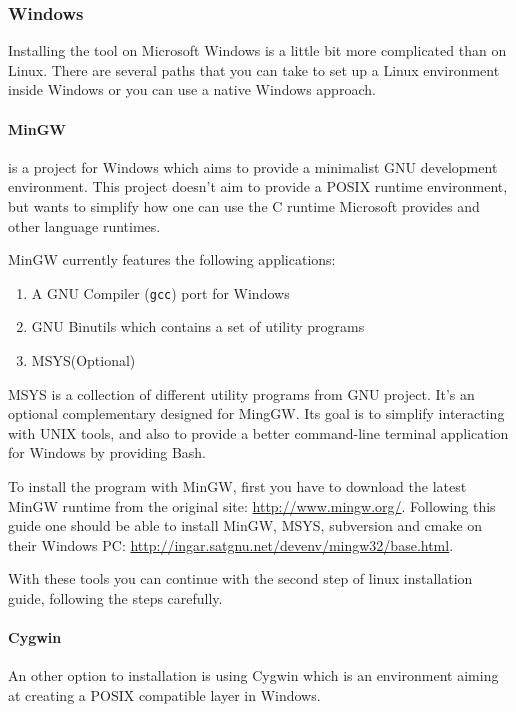 \subsubsection{Windows}
\par Installing the tool on Microsoft Windows is a little bit more complicated than on Linux. There are several paths that you can take to set up a Linux environment inside Windows or you can use a native Windows approach. 
\paragraph{MinGW} is a project for Windows which aims to provide a minimalist GNU development environment\cite{mingw_homepage}. This project doesn't aim to provide a POSIX runtime environment\cite{mingw_homepage}, but wants to simplify how one can use the C runtime Microsoft provides and other language runtimes. \medskip
\par MinGW currently features the following applications:
\begin{enumerate}
	\item A GNU Compiler (\verb|gcc|) port for Windows
	\item GNU Binutils which contains a set of utility programs
	\item MSYS(Optional)
\end{enumerate}
\par MSYS is a collection of different utility programs from GNU project. It's an optional complementary designed for MingGW\cite{mysis_page}. Its goal is to simplify interacting with UNIX tools, and also to provide a better command-line terminal application for Windows by providing Bash. \medskip
\par To install the program with MinGW, first you have to download the latest MinGW runtime from the original site: \url{http://www.mingw.org/}. Following this guide one should be able to install MinGW, MSYS, subversion and cmake on their Windows PC: \url{http://ingar.satgnu.net/devenv/mingw32/base.html}. \medskip
\par With these tools you can continue with the second step of linux installation guide, following the steps carefully. \medskip
\paragraph{Cygwin}
\par An other option to installation is using Cygwin which is an environment aiming at creating a POSIX compatible layer in Windows. \medskip
